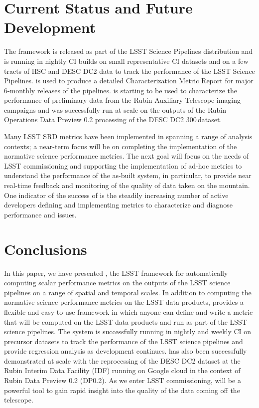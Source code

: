 \section{Current Status and Future Development} \label{sec:future}

The \faro framework is released as part of the LSST Science Pipelines distribution and is running in 
nightly CI builds on small representative CI datasets and on a few tracts of HSC and DESC DC2 data to track the performance of the LSST Science Pipelines.
\faro is used to produce a detailed Characterization Metric Report for major 6-monthly releases of the pipelines. 
\faro is starting to be used to characterize the performance of preliminary data from the Rubin Auxiliary Telescope imaging campaigns and was successfully run at scale on the outputs of the Rubin Operations Data Preview 0.2 processing of the DESC DC2 300\,\degsq dataset.

Many LSST SRD metrics have been implemented in \faro spanning a range of analysis contexts; a near-term focus will be on completing the implementation of the normative science performance metrics.
The next goal will focus on the needs of LSST commissioning and supporting the implementation of ad-hoc metrics to understand the performance of the as-built system, in particular, to provide near real-time feedback and monitoring of the quality of data taken on the mountain.
One indicator of the success of \faro is the steadily increasing number of active developers defining and implementing metrics to characterize and diagnose performance and issues.

\section{Conclusions} \label{sec:conclusions}

In this paper, we have presented \faro, the LSST framework for automatically computing scalar performance metrics on the outputs of the LSST science pipelines on a range of spatial and temporal scales.
In addition to computing the normative science performance metrics on the LSST data products, \faro provides a flexible and easy-to-use framework in which anyone can define and write a metric that will be computed on the LSST data products and run as part of the LSST science pipelines. 
The system is successfully running in nightly and weekly CI on precursor datasets to track the performance of the LSST science pipelines and provide regression analysis as development continues. 
\faro has also been successfully demonstrated at scale with the reprocessing of the DESC DC2 dataset \cite{2021ApJS..253...31L} at the Rubin Interim Data Facility (IDF) running on Google cloud \cite{2021arXiv211115030O} in the context of Rubin Data Preview 0.2 (DP0.2)\cite{RTN-001}. 
As we enter LSST commissioning, \faro will be a powerful tool to gain rapid insight into the quality of the data coming off the telescope. 
